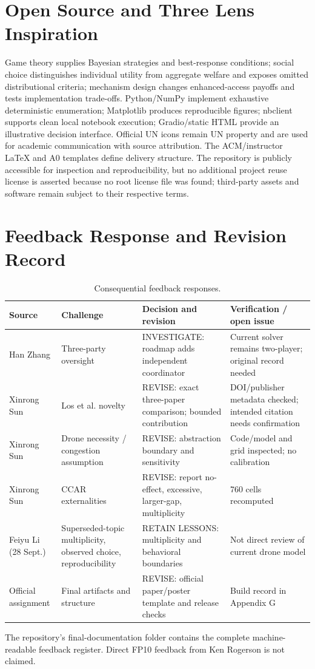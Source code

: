 \section{Open Source and Three Lens Inspiration}
Game theory supplies Bayesian strategies and best-response conditions; social choice distinguishes individual utility from aggregate welfare and exposes omitted distributional criteria; mechanism design changes enhanced-access payoffs and tests implementation trade-offs. Python/NumPy implement exhaustive deterministic enumeration; Matplotlib produces reproducible figures; nbclient supports clean local notebook execution; Gradio/static HTML provide an illustrative decision interface. Official UN icons remain UN property and are used for academic communication with source attribution. The ACM/instructor LaTeX and A0 templates define delivery structure. The repository is publicly accessible for inspection and reproducibility, but no additional project reuse license is asserted because no root license file was found; third-party assets and software remain subject to their respective terms.

\section{Feedback Response and Revision Record}
\begin{table}[H]\small\centering\caption{Consequential feedback responses.}
\begin{tabularx}{\columnwidth}{@{}p{1.5cm}p{2.1cm}YY@{}}\toprule Source & Challenge & Decision and revision & Verification / open issue\\\midrule
Han Zhang & Three-party oversight & INVESTIGATE: roadmap adds independent coordinator & Current solver remains two-player; original record needed\\
Xinrong Sun & Los et al. novelty & REVISE: exact three-paper comparison; bounded contribution & DOI/publisher metadata checked; intended citation needs confirmation\\
Xinrong Sun & Drone necessity / congestion assumption & REVISE: abstraction boundary and sensitivity & Code/model and grid inspected; no calibration\\
Xinrong Sun & CCAR externalities & REVISE: report no-effect, excessive, larger-gap, multiplicity & 760 cells recomputed\\
Feiyu Li (28 Sept.) & Superseded-topic multiplicity, observed choice, reproducibility & RETAIN LESSONS: multiplicity and behavioral boundaries & Not direct review of current drone model\\
Official assignment & Final artifacts and structure & REVISE: official paper/poster template and release checks & Build record in Appendix G\\\bottomrule
\end{tabularx}\end{table}
The repository's final-documentation folder contains the complete machine-readable feedback register. Direct FP10 feedback from Ken Rogerson is not claimed.

